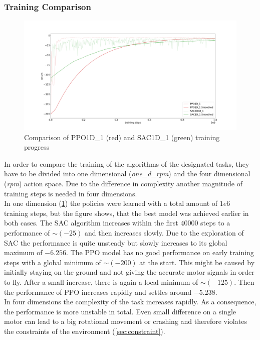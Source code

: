 \subsubsection{Training Comparison}
\begin{figure}
	\centering
	\includegraphics[width=\linewidth]{figures/1Dtrain.png}
	\caption{Comparison of PPO1D\_1 (red) and SAC1D\_1 (green) training progress}
	\label{fig:train1D}
\end{figure}
In order to compare the training of the algorithms of the designated tasks,
they have to be divided into one dimensional (\emph{one\_d\_rpm}) and the 
four dimensional (\emph{rpm}) action space. Due to the difference in complexity
another magnitude of training steps is needed in four dimensions.\\
In one dimension (\cref{fig:train1D}) the policies were learned with a total amount
of $1e6$ training steps, but the figure shows, that the best model was
achieved earlier in both cases. The SAC algorithm increases within the first 
$40000$ steps to a performance of $\sim (-25)$ and then increases slowly.
Due to the exploration of SAC the performance is quite unsteady but slowly
increases to its global maximum of $-6.256$.
The PPO model has no good performance on early training steps with a global 
minimum of $\sim (-200)$ at the start. This might be caused by initially
staying on the ground and not giving the accurate motor
signals in order to fly. After a small increase, there is again a
local minimum of $\sim (-125)$.
Then the performance of PPO increases rapidly and settles around $-5.238$.\\
In four dimensions the complexity of the task increases rapidly. 
As a consequence, the performance is more unstable in total.
Even small difference on a single motor can lead to a big rotational movement or
crashing and therefore violates the constraints of the environment (\cref{sec:constraint}).
